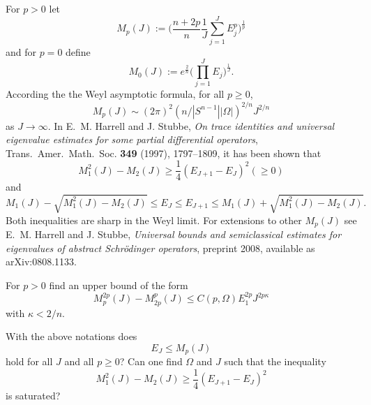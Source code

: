 \documentclass[12pt,letterpaper, reqno]{amsart}
\begin{document}
\begin{problemblock}
For $p>0$ let
\begin{equation}\label{ev-moments}
    M_{p}(J):=\bigg(\frac{n+2p}{n}\frac1{J}\sum_{j=1}^JE_j^p\bigg)^{\frac1{p}}
\end{equation}
and for $p=0$ define
\begin{equation}\label{geom-mean}
    M_{0}(J):=e^{\frac{2}{n}}\bigg(\prod_{j=1}^JE_j\bigg)^{\frac1{J}}.
\end{equation}
According the the Weyl asymptotic formula, for all $p\geq 0$,
\begin{equation*}
    M_{p}(J) \sim (2\pi)^2(n/|S^{n-1}||\Omega|)^{2/n}J^{2/n}
\end{equation*}
as $J\rightarrow\infty$. In E.~M. Harrell and J. Stubbe, \textit{On trace identities and
universal eigenvalue estimates for some partial differential
operators}, {Trans.\ Amer.\ Math.\ Soc.} \textbf{349} (1997),
1797--1809, it has been shown that
\begin{equation*}
    M_1^2(J)-M_{2}(J)\geq \frac1{4}(E_{J+1}-E_J)^2 (\geq 0)
\end{equation*}
and
\begin{equation*}
    M_1(J)-\sqrt{M_1^2(J)-M_{2}(J)}\leq E_J\leq E_{J+1}\leq
    M_1(J)+\sqrt{M_1^2(J)-M_{2}(J)}.
\end{equation*}
Both inequalities are sharp in the Weyl limit. For extensions to
other $M_p(J)$ see E.~M. Harrell and J. Stubbe, \textit{Universal bounds and
semiclassical estimates for eigenvalues of abstract Schr\"odinger
operators}, preprint 2008, available as arXiv:0808.1133.
\begin{problem}
For $p>0$ find an upper bound of
the form
\begin{equation*}
    M_p^{2p}(J)-M_{2p}^p(J)\leq C(p,\Omega)E_1^{2p}J^{2p\kappa}
\end{equation*}
with $\kappa<2/n$.

\end{problem}

\end{problemblock}

\begin{problemblock}


\begin{problem}
With the above notations does
\begin{equation*}
    E_J\leq M_p(J)
\end{equation*}
hold for all $J$ and all $p\geq 0$?
Can one find $\Omega$ and $J$ such that the inequality
\begin{equation*}
    M_1^2(J)-M_{2}(J)\geq \frac1{4}(E_{J+1}-E_J)^2
\end{equation*}
is saturated?
\end{problem}


\end{problemblock}
\end{document}
